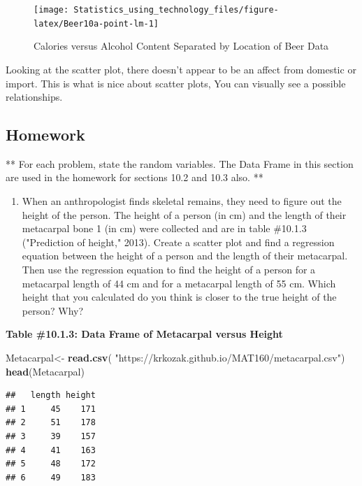 \documentclass[
]{book}
\newenvironment{Shaded}{\begin{snugshade}}{\end{snugshade}}
\newcommand{\KeywordTok}[1]{\textcolor[rgb]{0.13,0.29,0.53}{\textbf{#1}}}
\newcommand{\NormalTok}[1]{#1}
\newcommand{\StringTok}[1]{\textcolor[rgb]{0.31,0.60,0.02}{#1}}
\providecommand{\tightlist}{%
  \setlength{\itemsep}{0pt}\setlength{\parskip}{0pt}}
\begin{document}
\begin{figure}
\texttt{[image: Statistics\_using\_technology\_files/figure-latex/Beer10a-point-lm-1]} \caption{Calories versus Alcohol Content Separated by Location of Beer Data}\label{fig:Beer10a-point-lm}
\end{figure}

Looking at the scatter plot, there doesn't appear to be an affect from domestic or import. This is what is nice about scatter plots, You can visually see a possible relationships.

\hypertarget{homework-25}{%
\subsection{Homework}\label{homework-25}}

** For each problem, state the random variables. The Data Frame in this section are used
in the homework for sections 10.2 and 10.3 also. **

\begin{enumerate}
\def\labelenumi{\arabic{enumi}.}
\tightlist
\item
  When an anthropologist finds skeletal remains, they need to figure out the height of the person. The height of a person (in cm) and the length of their metacarpal bone 1 (in cm) were collected and are in table \#10.1.3 ("Prediction of height," 2013). Create a scatter plot and find a regression equation between the height of a person and the length of their metacarpal. Then use the regression equation to find the height of a person for a metacarpal length of 44 cm and for a metacarpal length of 55 cm. Which height that you calculated do you think is closer to the true height of the person? Why?
\end{enumerate}

\textbf{Table \#10.1.3: Data Frame of Metacarpal versus Height}

\begin{Shaded}
\begin{Highlighting}[]
\NormalTok{Metacarpal<-}\StringTok{ }\KeywordTok{read.csv}\NormalTok{(}
  \StringTok{"https://krkozak.github.io/MAT160/metacarpal.csv"}\NormalTok{)}
\KeywordTok{head}\NormalTok{(Metacarpal)}
\end{Highlighting}
\end{Shaded}

\begin{verbatim}
##   length height
## 1     45    171
## 2     51    178
## 3     39    157
## 4     41    163
## 5     48    172
## 6     49    183
\end{verbatim}
\end{document}
